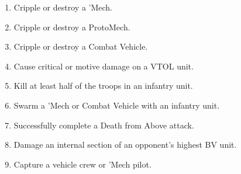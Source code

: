 \begin{enumerate}

\item Cripple or destroy a 'Mech.

\item Cripple or destroy a ProtoMech.

\item Cripple or destroy a Combat Vehicle.

\item Cause critical or motive damage on a VTOL unit.

\item Kill at least half of the troops in an infantry unit.

\item Swarm a 'Mech or Combat Vehicle with an infantry unit.

\item Successfully complete a Death from Above attack.

\item Damage an internal section of an opponent's highest BV unit.

\item Capture a vehicle crew or 'Mech pilot.

\end{enumerate}
